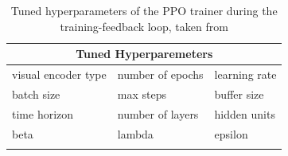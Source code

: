 \begin{longtable}{@{} p{3.5cm} p{3.5cm} p{3.5cm} @{}} \toprule
\multicolumn{3}{c}{Tuned Hyperparemeters}\\ \midrule
visual encoder type         & 
number of epochs                   & 
learning rate               \\ 

batch size                  &  
max steps                   &
buffer size                 \\

time horizon                &
number of layers            &
hidden units                \\

beta                        &
lambda                      &
epsilon                     \\\bottomrule
\caption{Tuned hyperparameters of the PPO trainer during the training-feedback loop, taken from \cite{github-unity-mlagents-toolkit}} \label{tab:trainer-hyperparameters}
\end{longtable} 



% 




